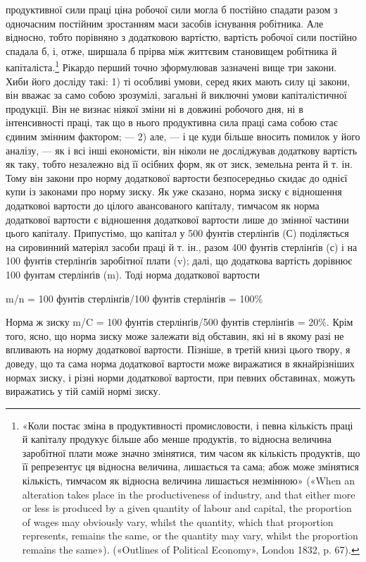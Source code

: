 \parcont{}  %
продуктивної сили праці ціна робочої сили могла б постійно
спадати разом з одночасним постійним зростанням маси засобів
існування робітника. Але відносно, тобто порівняно з додатковою
вартістю, вартість робочої сили постійно спадала б, і, отже,
ширшала б прірва між життєвим становищем робітника й капіталіста.\footnote{
«Коли постає зміна в продуктивності промисловости, і певна
кількість праці й капіталу продукує більше або менше продуктів, то
відносна величина заробітної плати може значно змінятися, тим часом як
кількість продуктів, що її репрезентує ця відносна величина, лишається
та сама; абож може змінятися кількість, тимчасом як відносна
величина лишається незмінною» («When an alteration takes place in the productiveness
of industry, and that either more or less is produced by a given
quantity of labour and capital, the proportion of wages may obviously
vary, whilst the quantity, which that proportion represents, remains the
same, or the quantity may vary, whilst the proportion remains the same»).
(«Outlines of Political Economy», London 1832, p. 67).
}
Рікардо перший точно зформулював зазначені вище три закони.
Хиби його досліду такі: 1) ті особливі умови, серед яких
мають силу ці закони, він вважає за само собою зрозумілі, загальні
й виключні умови капіталістичної продукції. Він не визнає
ніякої зміни ні в довжині робочого дня, ні в інтенсивності
праці, так що в нього продуктивна сила праці сама собою стає
єдиним змінним фактором; — 2) але, — і це куди більше вносить
помилок у його аналізу, — як і всі інші економісти, він ніколи
не досліджував додаткову вартість як таку, тобто незалежно
від її осібних форм, як от зиск, земельна рента й т. ін. Тому
він закони про норму додаткової вартости безпосередньо скидає
до однієї купи із законами про норму зиску. Як уже сказано,
норма зиску є відношення додатковоі вартости до цілого
авансованого капіталу, тимчасом як норма додаткової вартости
є відношення додаткової вартости лише до змінної частини
цього капіталу. Припустімо, що капітал у 500 фунтів стерлінґів
(С) поділяється на сировинний матеріял засоби праці й т. ін.,
разом 400 фунтів стерлінґів (с) і на 100 фунтів стерлінґів заробітної
плати (v); далі, що додаткова вартість дорівнює 100 фунтам
стерлінґів (m). Тоді норма додаткової вартости

m/n = 100 фунтів стерлінґів/100 фунтів стерлінґів = 100\%

Норма ж зиску m/C = 100 фунтів стерлінґів/500 фунтів стерлінґів = 20\%. Крім того,
ясно, що норма зиску може залежати від обставин, які ні в якому
разі не впливають на норму додаткової вартости. Пізніше, в
третій книзі цього твору, я доведу, що та сама норма додаткової
вартости може виражатися в якнайрізніших нормах зиску, і
різні норми додаткової вартости, при певних обставинах, можуть
виражатись у тій самій нормі зиску.
